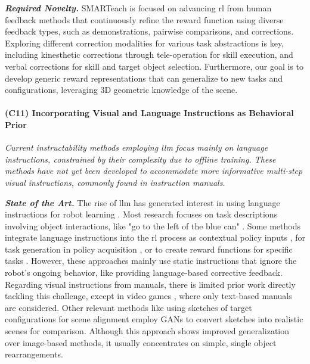 \documentclass{erc-B2}
\begin{document}
\textit{\textbf{Required Novelty.}} SMARTeach is focused on advancing \gls*{rl} from human feedback methods that continuously refine the reward function using diverse feedback types, such as demonstrations, pairwise comparisons, and corrections. Exploring different correction modalities for various task abstractions is key, including kinesthetic corrections through tele-operation for skill execution, and verbal corrections for skill and target object selection. Furthermore, our goal is to develop generic reward representations that can generalize to new tasks and configurations, leveraging 3D geometric knowledge of the scene. %


\paragraph{(C11) Incorporating Visual and Language Instructions as Behavioral Prior}
\textit{Current instructability methods employing \gls*{llm} focus mainly on language instructions, constrained by their complexity due to offline training. These methods have not yet been developed to accommodate more informative multi-step visual instructions, commonly found in instruction manuals.}

\textbf{\textit{State of the Art.}} The rise of \gls*{llm} has generated interest in using language instructions for robot learning \cite{saycan2022arxiv,Pratyusha2020CorrectingNLF,nair2021learning}. Most research focuses on task descriptions involving object interactions, like "go to the left of the blue can" \cite{Pratyusha2020CorrectingNLF}. Some methods integrate language instructions into the \gls*{rl} process as contextual policy inputs \cite{nair2021learning}, for task generation in policy acquisition \cite{ge2023policy}, or to create reward functions for specific tasks \cite{yu2023language}. However, these approaches mainly use static instructions that ignore the robot's ongoing behavior, like providing language-based corrective feedback.
Regarding visual instructions from manuals, there is limited prior work directly tackling this challenge, except in video games \cite{wu2023read}, where only text-based manuals are considered. Other relevant methods like using sketches of target configurations for scene alignment \cite{Sundaresan2023RTSketch} employ GANs \cite{goodfellow2014gan} to convert sketches into realistic scenes for comparison. Although this approach shows improved generalization over image-based methods, it usually concentrates on simple, single object rearrangements.
\end{document}
